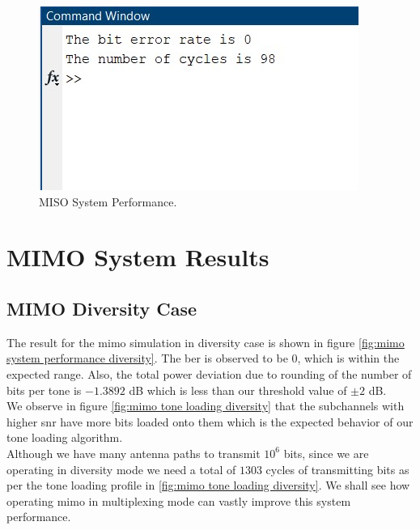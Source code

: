 \begin{figure}[!htbp]
\centering
\includegraphics[scale=1]{Chapter 4/Figures/MISO System Performance}
\caption{MISO System Performance.}
\label{fig:miso system performance}
\end{figure}

\section{MIMO System Results}

\subsection{MIMO Diversity Case}
The result for the \acrshort{mimo} simulation in diversity case is shown in figure \ref{fig:mimo system performance diversity}. The \acrshort{ber} is observed to be $0$, which is within the expected range. Also, the total power deviation due to rounding of the number of bits per tone is $-1.3892$ dB which is less than our threshold value of $\pm 2$ dB.\\
We observe in figure \ref{fig:mimo tone loading diversity} that the subchannels with higher \acrshort{snr} have more bits loaded onto them which is the expected behavior of our tone loading algorithm.\\
Although we have many antenna paths to transmit $10^6$ bits, since we are operating in diversity mode we need a total of $1303$ cycles of transmitting bits as per the tone loading profile in \ref{fig:mimo tone loading diversity}. We shall see how operating \acrshort{mimo} in multiplexing mode can vastly improve this system performance.

